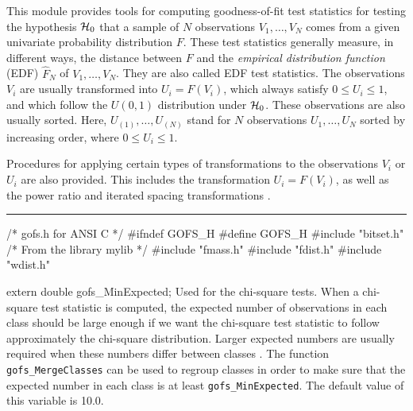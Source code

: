 
This module provides tools for computing goodness-of-fit test statistics
for testing the hypothesis $\mathcal{H}_0$ that a sample of $N$ observations
$V_1,\dots,V_N$ comes from a given univariate probability
distribution $F$.
These test statistics generally measure, in different ways, the
distance between $F$ and the {\em empirical distribution function\/}
(EDF) $\hat F_N$ of $V_1,\dots,V_N$.
They are also called EDF test statistics.
The observations $V_i$ are usually transformed into $U_i = F(V_i)$,
which always satisfy $0\le U_i\le 1$, and which
follow the $U(0,1)$ distribution under $\mathcal{H}_0$.
These observations are also usually sorted.
Here, $U_{(1)}, \dots, U_{(N)}$ stand for $N$ observations
$U_1,\dots,U_N$ sorted by increasing order, where $0\le U_i\le 1$.

Procedures for applying certain types of transformations to the
observations $V_i$ or $U_i$ are also provided.
This includes the transformation $U_i = F(V_i)$, as well as
the power ratio and iterated spacing transformations \cite{tSTE86a}.


\bigskip\hrule\medskip
\code\hide
/* gofs.h for ANSI C */
#ifndef GOFS_H
#define GOFS_H
\endhide
#include "bitset.h"       /* From the library mylib */
#include "fmass.h"
#include "fdist.h"
#include "wdist.h"
\endcode



\code


extern double gofs_MinExpected;
\endcode
  \tab  Used for the chi-square tests.
  When a chi-square test statistic is computed, the expected number
  of observations in each class should be large enough if we want
  the chi-square test statistic to follow approximately the
  chi-square distribution.  Larger expected numbers are usually
  required when these numbers differ between classes \cite{tREA88a}.
  The function {\tt gofs\_MergeClasses} can be used to regroup classes
  in order to make sure that the expected number in each class is
  at least {\tt gofs\_MinExpected}.
  The default value of this variable is 10.0.
\iffalse %
  This is for testu01:
  For some tests, the software will merge
  classes in such a way that this is always so. For others, an error
  message will be printed if this not the case (see the {\it restrictions}
  that apply for the different tests).
\fi %
  \endtab
\ifdetailed  %
\code


